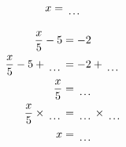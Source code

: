 \documentclass[12pt]{article}
\newcounter{minipagecount}
\begin{document}
\begin{multicols}{2}
\begin{minipage}[t]{0.45\textwidth}
\begin{align*}
        x &= \dotuline{\hspace{5mm}}\\
    \end{align*}
\end{minipage} %
\noindent{(\theminipagecount)}\hspace{0.1mm} %
\begin{minipage}[t]{0.45\textwidth} %
    \vspace{-26pt}  %
    \raggedright %
    \begin{align*} %
        \frac{x}{5} - 5 &= -2\\
        \frac{x}{5} - 5 + \dotuline{\hspace{5mm}} &= -2 + \dotuline{\hspace{5mm}}\\
        \frac{x}{5} &= \dotuline{\hspace{5mm}}\\
        \frac{x}{5} \times\dotuline{\hspace{5mm}} &= \dotuline{\hspace{5mm}} \times\dotuline{\hspace{5mm}}\\
        x &= \dotuline{\hspace{5mm}}\\
    \end{align*}
\end{minipage}\newpage
\noindent{(\theminipagecount)}\hspace{0.1mm} %
\begin{minipage}[t]{0.45\textwidth} %
    \vspace{-26pt}  %

\end{minipage}
\end{multicols}
\end{document}

